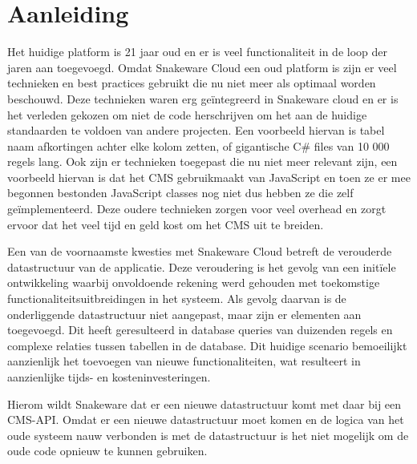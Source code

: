 \section{Aanleiding}
Het huidige platform is 21 jaar oud en er is veel functionaliteit in de loop der jaren aan toegevoegd.
Omdat Snakeware Cloud een oud platform is zijn er veel technieken en best practices gebruikt die nu niet meer als optimaal worden beschouwd.
Deze technieken waren erg geïntegreerd in Snakeware cloud en er is het verleden gekozen om niet de code herschrijven om het aan de huidige standaarden te voldoen van andere projecten.
Een voorbeeld hiervan is tabel naam afkortingen achter elke kolom zetten, of gigantische C\# \Parencite{CSharp} files van 10 000 regels lang.
Ook zijn er technieken toegepast die nu niet meer relevant zijn, een voorbeeld hiervan is dat het \gls{CMS} gebruikmaakt van JavaScript \Parencite{JavaScript} en toen ze er mee begonnen bestonden JavaScript classes nog niet dus hebben ze die zelf geïmplementeerd.
Deze oudere technieken zorgen voor veel overhead en zorgt ervoor dat het veel tijd en geld kost om het \gls{CMS} uit te breiden.

\whitespace[2]
Een van de voornaamste kwesties met Snakeware Cloud betreft de verouderde datastructuur van de applicatie.
Deze veroudering is het gevolg van een initïele ontwikkeling waarbij onvoldoende rekening werd gehouden met toekomstige functionaliteitsuitbreidingen in het systeem.
Als gevolg daarvan is de onderliggende datastructuur niet aangepast, maar zijn er elementen aan toegevoegd.
Dit heeft geresulteerd in database queries van duizenden regels en complexe relaties tussen tabellen in de database.
Dit huidige scenario bemoeilijkt aanzienlijk het toevoegen van nieuwe functionaliteiten, wat resulteert in aanzienlijke tijds- en kosteninvesteringen.

\whitespace[2]
Hierom wildt Snakeware dat er een nieuwe datastructuur komt met daar bij een \gls{CMS}-API.
Omdat er een nieuwe datastructuur moet komen en de logica van het oude systeem nauw verbonden is met de datastructuur is het niet mogelijk om de oude code opnieuw te kunnen
gebruiken.
